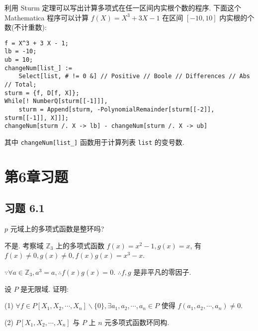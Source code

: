 \documentclass[color=black,device=normal,lang=cn,mode=geye]{elegantnote}
\begin{document}
利用 Sturm 定理可以写出计算多项式在任一区间内实根个数的程序. 下面这个 Mathematica 程序可以计算 $f(X)=X^3+3X-1$ 在区间 $[-10,10]$ 内实根的个数(不计重数):
\begin{verbatim}
f = X^3 + 3 X - 1;
lb = -10;
ub = 10;
changeNum[list_] := 
    Select[list, # != 0 &] // Positive // Boole // Differences // Abs // Total;
sturm = {f, D[f, X]};
While[! NumberQ[sturm[[-1]]], 
    sturm = Append[sturm, -PolynomialRemainder[sturm[[-2]], sturm[[-1]], X]]];
changeNum[sturm /. X -> lb] - changeNum[sturm /. X -> ub]
\end{verbatim}
其中 \verb|changeNum[list_]| 函数用于计算列表 \verb|list| 的变号数.
\section{第6章习题}
\subsection{习题 6.1}
\begin{exercise}%
    $p$ 元域上的多项式函数是整环吗?
\end{exercise}
\begin{solution}
    不是. 考察域 $\mathbb{Z}_3$ 上的多项式函数 $f(x)=x^2-1,g(x)=x$, 有 $f(x)\neq0,g(x)\neq0,f(x)g(x)=x^3-x$.

    $\because\forall a\in\mathbb{Z}_3,a^3=a,\therefore f(x)g(x)=0$. $\therefore f,g$ 是非平凡的零因子.
\end{solution}
\begin{exercise}%
    设 $P$ 是无限域. 证明:
    
    (1) $\forall f\in P[X_1,X_2,\cdots,X_n]\backslash\{0\},\exists a_1,a_2,\cdots,a_n\in P$ 使得 $f(a_1,a_2,\cdots,a_n)\neq0$.

    (2) $P[X_1,X_2,\cdots,X_n]$ 与 $P$ 上 $n$ 元多项式函数环同构.
\end{exercise}
\end{document}
